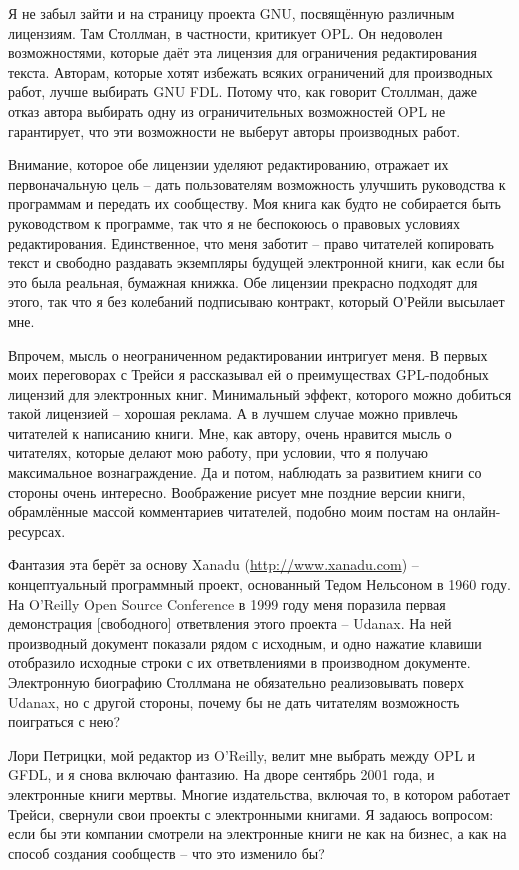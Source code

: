 Я не забыл зайти и на страницу проекта GNU, посвящённую различным лицензиям. Там Столлман, в частности, критикует OPL. Он недоволен возможностями, которые даёт эта лицензия для ограничения редактирования текста. Авторам, которые хотят избежать всяких ограничений для производных работ, лучше выбирать GNU FDL. Потому что, как говорит Столлман, даже отказ автора выбирать одну из ограничительных возможностей OPL не гарантирует, что эти возможности не выберут авторы производных работ.

Внимание, которое обе лицензии уделяют редактированию, отражает их первоначальную цель -- дать пользователям возможность улучшить руководства к программам и передать их сообществу. Моя книга как будто не собирается быть руководством к программе, так что я не беспокоюсь о правовых условиях редактирования. Единственное, что меня заботит -- право читателей копировать текст и свободно раздавать экземпляры будущей электронной книги, как если бы это была реальная, бумажная книжка. Обе лицензии прекрасно подходят для этого, так что я без колебаний подписываю контракт, который О'Рейли высылает мне.

Впрочем, мысль о неограниченном редактировании интригует меня. В первых моих переговорах с Трейси я рассказывал ей о преимуществах GPL-подобных лицензий для электронных книг. Минимальный эффект, которого можно добиться такой лицензией -- хорошая реклама. А в лучшем случае можно привлечь читателей к написанию книги. Мне, как автору, очень нравится мысль о читателях, которые делают мою работу, при условии, что я получаю максимальное вознаграждение. Да и потом, наблюдать за развитием книги со стороны очень интересно. Воображение рисует мне поздние версии книги, обрамлённые массой комментариев читателей, подобно моим постам на онлайн-ресурсах.

Фантазия эта берёт за основу Xanadu (\url{http://www.xanadu.com}) -- концептуальный программный проект, основанный Тедом Нельсоном в 1960 году. На O'Reilly Open Source Conference в 1999 году меня поразила первая демонстрация [свободного] ответвления этого проекта -- Udanax. На ней производный документ показали рядом с исходным, и одно нажатие клавиши отобразило исходные строки с их ответвлениями в производном документе. Электронную биографию Столлмана не обязательно реализовывать поверх Udanax, но с другой стороны, почему бы не дать читателям возможность поиграться с нею?

Лори Петрицки, мой редактор из O'Reilly, велит мне выбрать между OPL и GFDL, и я снова включаю фантазию. На дворе сентябрь 2001 года, и электронные книги мертвы. Многие издательства, включая то, в котором работает Трейси, свернули свои проекты с электронными книгами. Я задаюсь вопросом: если бы эти компании смотрели на электронные книги не как на бизнес, а как на способ создания сообществ -- что это изменило бы?

